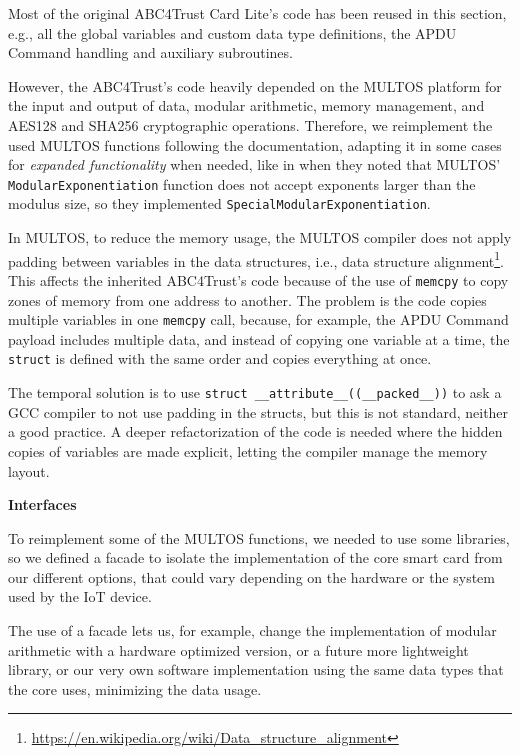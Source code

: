\documentclass[journal]{IEEEtran}
\begin{document}
Most of the original ABC4Trust Card Lite's code has been reused in this section, e.g., all the global variables and custom data type definitions, the APDU Command handling and auxiliary subroutines.

However, the ABC4Trust's code heavily depended on the MULTOS platform for the input and output of data, modular arithmetic, memory management, and AES128 and SHA256 cryptographic operations. Therefore, we reimplement the used MULTOS functions following the documentation, adapting it in some cases for \textit{expanded functionality} when needed, like in \cite{vullers2013efficient} when they noted that MULTOS' \texttt{ModularExponentiation}  function does not accept exponents larger than the modulus size, so they implemented \texttt{SpecialModularExponentiation}.

In MULTOS, to reduce the memory usage, the MULTOS compiler does not apply padding between variables in the data structures, i.e., data structure alignment\footnote{\url{https://en.wikipedia.org/wiki/Data_structure_alignment}}.
This affects the inherited ABC4Trust's code because of the use of \texttt{memcpy} to copy zones of memory from one address to another. The problem is the code copies multiple variables in one \texttt{memcpy} call, because, for example, the APDU Command payload includes multiple data, and instead of copying one variable at a time, the \texttt{struct} is defined with the same order and copies everything at once.

The temporal solution is to use \texttt{struct \_\_attribute\_\_((\_\_packed\_\_))} to ask a GCC compiler to not use padding in the structs, but this is not standard, neither a good practice. A deeper refactorization of the code is needed where the hidden copies of variables are made explicit, letting the compiler manage the memory layout.



\textbf{Interfaces}\hfil

To reimplement some of the MULTOS functions, we needed to use some libraries, so we defined a facade to isolate the implementation of the core smart card from our different options, that could vary depending on the hardware or the system used by the IoT device.

The use of a facade lets us, for example, change the implementation of modular arithmetic with a hardware optimized version, or a future more lightweight library, or our very own software implementation using the same data types that the core uses, minimizing the data usage.
\end{document}
